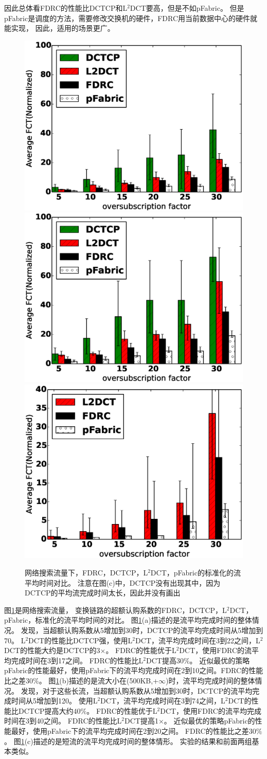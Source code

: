 因此总体看FDRC的性能比DCTCP和L$^2$DCT要高，但是不如pFabric。
但是pFabric是调度的方法，需要修改交换机的硬件，FDRC用当前数据中心的硬件就能实现，
因此，适用的场景更广。

\begin{figure}[h]
\centering
{}
 {\includegraphics[width=0.32\columnwidth]{figures/FDRC/evaluation/spineleaf/fct.eps}}
{\includegraphics[width=0.32\columnwidth]{figures/FDRC/evaluation/spineleaf/large_fct.eps}}
{\includegraphics[width=0.32\columnwidth]{figures/FDRC/evaluation/spineleaf/small_fct.eps}}
\caption{网络搜索流量下，FDRC，DCTCP，L$^2$DCT，pFabric的标准化的流平均时间对比。 注意在图(c)中，DCTCP没有出现其中，因为DCTCP的平均流完成时间太长，因此并没有画出}
\label{fdrc-fct-spine-fct-factor-fig}
\end{figure}

图\ref{fdrc-fct-spine-fct-factor-fig}是网络搜索流量， 
变换链路的超额认购系数的FDRC，DCTCP，L$^2$DCT，pFabric，标准化的流平均时间的对比。
图\ref{fdrc-fct-spine-fct-factor-fig}(a)描述的是流平均完成时间的整体情况。
发现，当超额认购系数从5增加到30时，DCTCP的流平均完成时间从5增加到70。
L$^2$DCT的性能比DCTCP强，使用L$^2$DCT，流平均完成时间在3到22之间，L$^2$DCT的性能大约是DCTCP的3$\times$。
FDRC的性能优于L$^2$DCT，使用FDRC的流平均完成时间在3到17之间。
FDRC的性能比L$^2$DCT提高$30\%$。
近似最优的策略pFabric的性能最好，使用pFabric下的流平均完成时间在2到10之间。FDRC的性能比之差$30\%$。
图\ref{fdrc-fct-spine-fct-factor-fig}(b)描述的是流大小在(500KB,+$\infty$)时，流平均完成时间的整体情况。
发现，对于这些长流，当超额认购系数从5增加到30时，DCTCP的流平均完成时间从5增加到120。
使用L$^2$DCT，流平均完成时间在3到74之间，L$^2$DCT的性能比DCTCP提高大约$40\%$。
FDRC的性能优于L$^2$DCT，使用FDRC的流平均完成时间在3到40之间。
FDRC的性能比L$^2$DCT提高1$\times$。
近似最优的策略pFabric的性能最好，使用pFabric下的流平均完成时间在2到20之间。
FDRC的性能比之差$30\%$。
图\ref{fdrc-fct-spine-fct-factor-fig}(c)描述的是短流的流平均完成时间的整体情形。
实验的结果和前面两组基本类似。

